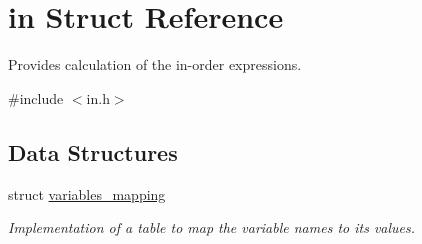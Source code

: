 \hypertarget{structin}{\section{in Struct Reference}
\label{structin}
}


Provides calculation of the in-\/order expressions.  




{\ttfamily \#include $<$in.\-h$>$}

\subsection*{Data Structures}
\begin{DoxyCompactItemize}
\item 
struct \hyperlink{structin_1_1variables__mapping}{variables\-\_\-mapping}
\begin{DoxyCompactList}\small\item\em Implementation of a table to map the variable names to its values. \end{DoxyCompactList}\end{DoxyCompactItemize}
